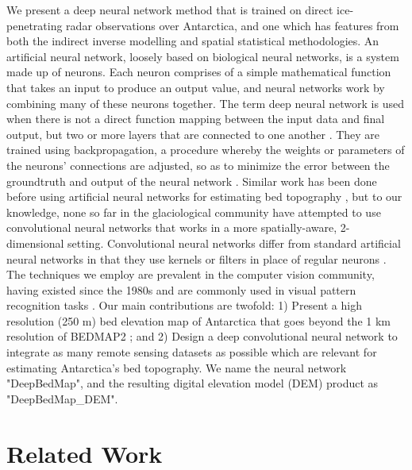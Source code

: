 \documentclass[tc, manuscript]{copernicus}
\begin{document}
We present a deep neural network method that is trained on direct ice-penetrating radar observations over Antarctica, and one which has features from both the indirect inverse modelling and spatial statistical methodologies.
An artificial neural network, loosely based on biological neural networks, is a system made up of neurons.
Each neuron comprises of a simple mathematical function that takes an input to produce an output value, and neural networks work by combining many of these neurons together.
The term deep neural network is used when there is not a direct function mapping between the input data and final output, but two or more layers that are connected to one another \citep[see][for a review]{LeCunDeeplearning2015}.
They are trained using backpropagation, a procedure whereby the weights or parameters of the neurons' connections are adjusted, so as to minimize the error between the groundtruth and output of the neural network \citep{RumelhartLearningrepresentationsbackpropagating1986}. Similar work has been done before using artificial neural networks for estimating bed topography \citep[e.g.][]{ClarkeNeuralNetworksApplied2009,MonnierInferencebedtopography2018}, but to our knowledge, none so far in the glaciological community have attempted to use convolutional neural networks that works in a more spatially-aware, 2-dimensional setting.
Convolutional neural networks differ from standard artificial neural networks in that they use kernels or filters in place of regular neurons \citep[again, see][for a review]{LeCunDeeplearning2015}.
The techniques we employ are prevalent in the computer vision community, having existed since the 1980s \citep{FukushimaNeocognitronnewalgorithm1982,LeCunBackpropagationAppliedHandwritten1989} and are commonly used in visual pattern recognition tasks \citep[e.g.][]{LecunGradientbasedlearningapplied1998,KrizhevskyImageNetClassificationDeep2012}.
Our main contributions are twofold:
1) Present a high resolution (250 m) bed elevation map of Antarctica that goes beyond the 1 km resolution of BEDMAP2 \citep{FretwellBedmap2improvedice2013}; and
2) Design a deep convolutional neural network to integrate as many remote sensing datasets as possible which are relevant for estimating Antarctica's bed topography.
We name the neural network "DeepBedMap", and the resulting digital elevation model (DEM) product as "DeepBedMap\_DEM".


\section{Related Work}
\end{document}
